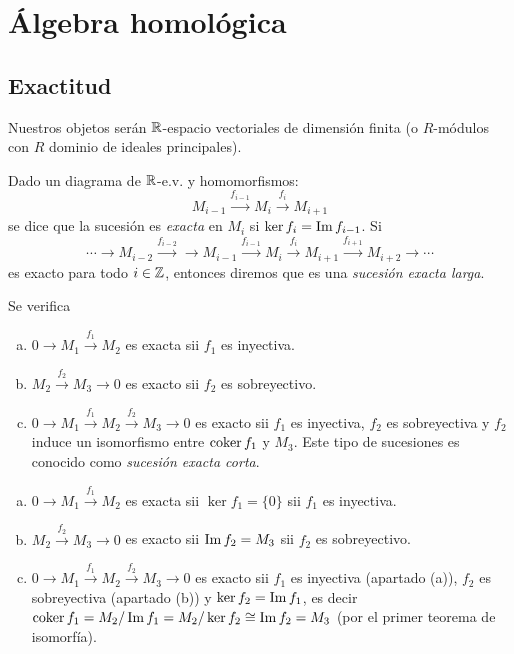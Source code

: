 \documentclass[HS.tex]{subfiles}
\begin{document}
\chapter{Álgebra homológica}
\section{Exactitud}
Nuestros objetos serán $\mathbb{R}$-espacio vectoriales de dimensión finita (o $R$-módulos con $R$ dominio de ideales principales).

\begin{defi}
Dado un diagrama de $\mathbb{R}$-e.v. y homomorfismos:
\[ M_{i-1} \xrightarrow{f_{i-1}} M_i \xrightarrow{f_i} M_{i+1} \]
se dice que la sucesión es \emph{exacta} en $M_i$ si $\ker f_i = \operatorname{Im} f_{i-1}$. Si
\[ \cdots \rightarrow M_{i-2} \xrightarrow{f_{i-2}} \rightarrow M_{i-1} \xrightarrow{f_{i-1}} M_i \xrightarrow{f_i} M_{i+1} \xrightarrow{f_{i+1}} M_{i+2} \rightarrow \cdots \]
es exacto para todo $i \in \mathbb{Z}$, entonces diremos que es una \emph{sucesión exacta larga}.
\end{defi}

\begin{lemma}
Se verifica
\begin{enumerate}[a)]
\item $0 \rightarrow M_1 \xrightarrow{f_1} M_2$ es exacta sii $f_1$ es inyectiva.
\item $M_2 \xrightarrow{f_2} M_3 \rightarrow 0$ es exacto sii $f_2$ es sobreyectivo.
\item $0 \rightarrow M_1 \xrightarrow{f_1} M_2 \xrightarrow{f_2} M_3 \rightarrow 0$ es exacto sii $f_1$ es inyectiva, $f_2$ es sobreyectiva y $f_2$ induce un isomorfismo entre $\operatorname{coker} f_1$ y $M_3$. Este tipo de sucesiones es conocido como \emph{sucesión exacta corta}.
\end{enumerate}
\end{lemma}
\begin{dem}
\begin{enumerate}[a)]
\item $0 \rightarrow M_1 \xrightarrow{f_1} M_2$ es exacta sii $\ker f_1 = \{0\}$ sii $f_1$ es inyectiva.
\item $M_2 \xrightarrow{f_2} M_3 \rightarrow 0$ es exacto sii $\operatorname{Im} f_2 = M_3$ sii $f_2$ es sobreyectivo.
\item $0 \rightarrow M_1 \xrightarrow{f_1} M_2 \xrightarrow{f_2} M_3 \rightarrow 0$ es exacto sii $f_1$ es inyectiva (apartado (a)), $f_2$ es sobreyectiva (apartado (b)) y $\ker f_2 = \operatorname{Im} f_1$, es decir $\operatorname{coker} f_1 = M_2/\operatorname{Im} f_1 = M_2/\ker f_2 \cong \operatorname{Im} f_2 = M_3$ (por el primer teorema de isomorfía).
\end{enumerate}
\end{dem}
\end{document}
